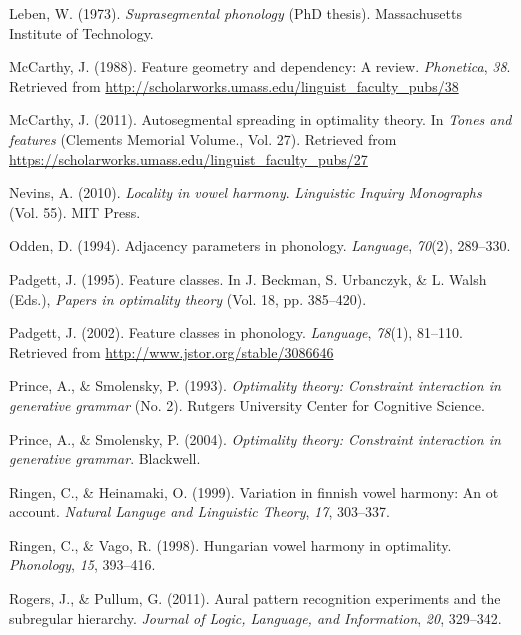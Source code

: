 \documentclass[floatsintext,man]{apa6}
\theoremstyle{definition}
\theoremstyle{definition}
\theoremstyle{definition}
\theoremstyle{remark}
\begin{document}
\hypertarget{ref-leben1973}{}
Leben, W. (1973). \emph{Suprasegmental phonology} (PhD thesis).
Massachusetts Institute of Technology.

\hypertarget{ref-mccarthyfg1988}{}
McCarthy, J. (1988). Feature geometry and dependency: A review.
\emph{Phonetica}, \emph{38}. Retrieved from
\url{http://scholarworks.umass.edu/linguist_faculty_pubs/38}

\hypertarget{ref-mccarthy2011}{}
McCarthy, J. (2011). Autosegmental spreading in optimality theory. In
\emph{Tones and features} (Clements Memorial Volume., Vol. 27).
Retrieved from
\url{https://scholarworks.umass.edu/linguist_faculty_pubs/27}

\hypertarget{ref-Nevins2010}{}
Nevins, A. (2010). \emph{Locality in vowel harmony}. \emph{Linguistic
Inquiry Monographs} (Vol. 55). MIT Press.

\hypertarget{ref-odden1994}{}
Odden, D. (1994). Adjacency parameters in phonology. \emph{Language},
\emph{70}(2), 289--330.

\hypertarget{ref-padgett1995}{}
Padgett, J. (1995). Feature classes. In J. Beckman, S. Urbanczyk, \& L.
Walsh (Eds.), \emph{Papers in optimality theory} (Vol. 18, pp.
385--420).

\hypertarget{ref-padgett2002}{}
Padgett, J. (2002). Feature classes in phonology. \emph{Language},
\emph{78}(1), 81--110. Retrieved from
\url{http://www.jstor.org/stable/3086646}

\hypertarget{ref-princesmolensky1993}{}
Prince, A., \& Smolensky, P. (1993). \emph{Optimality theory: Constraint
interaction in generative grammar} (No. 2). Rutgers University Center
for Cognitive Science.

\hypertarget{ref-princesmolensky2004}{}
Prince, A., \& Smolensky, P. (2004). \emph{Optimality theory: Constraint
interaction in generative grammar}. Blackwell.

\hypertarget{ref-ringenheinamaki1999}{}
Ringen, C., \& Heinamaki, O. (1999). Variation in finnish vowel harmony:
An ot account. \emph{Natural Languge and Linguistic Theory}, \emph{17},
303--337.

\hypertarget{ref-ringenvago1998}{}
Ringen, C., \& Vago, R. (1998). Hungarian vowel harmony in optimality.
\emph{Phonology}, \emph{15}, 393--416.

\hypertarget{ref-rogerspullum2011}{}
Rogers, J., \& Pullum, G. (2011). Aural pattern recognition experiments
and the subregular hierarchy. \emph{Journal of Logic, Language, and
Information}, \emph{20}, 329--342.
\end{document}
